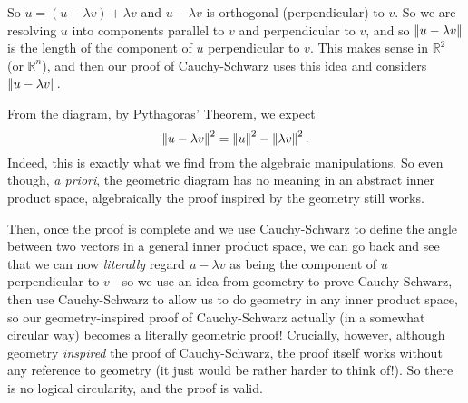 \documentclass{article}
\newcommand{\norm}[1]{\left|\kern-1pt\left|#1\right|\kern-1pt\right|}
\begin{document}
\begin{center}
\end{center}

So $u=(u-\lambda v)+\lambda v$ and $u-\lambda v$ is orthogonal (perpendicular) to $v$. So we are resolving $u$ into components parallel to $v$ and perpendicular to $v$, and so $\norm{u-\lambda v}$ is the length of the component of $u$ perpendicular to $v$. This makes sense in $\mathbb{R}^2$ (or $\mathbb{R}^n$), and then our proof of Cauchy-Schwarz uses this idea and considers $\norm{u-\lambda v}$.

From the diagram, by Pythagoras' Theorem, we expect
\[\norm{u-\lambda v}^2=\norm{u}^2-\norm{\lambda v}^2.\]
Indeed, this is exactly what we find from the algebraic manipulations. So even though, \textit{a priori}, the geometric diagram has no meaning in an abstract inner product space, algebraically the proof inspired by the geometry still works.

Then, once the proof is complete and we use Cauchy-Schwarz to define the angle between two vectors in a general inner product space, we can go back and see that we can now \textit{literally} regard $u-\lambda v$ as being the component of $u$ perpendicular to $v$---so we use an idea from geometry to prove Cauchy-Schwarz, then use Cauchy-Schwarz to allow us to do geometry in any inner product space, so our geometry-inspired proof of Cauchy-Schwarz actually (in a somewhat circular way) becomes a literally geometric proof! Crucially, however, although geometry \textit{inspired} the proof of Cauchy-Schwarz, the proof itself works without any reference to geometry (it just would be rather harder to think of!). So there is no logical circularity, and the proof is valid.
\end{document}
